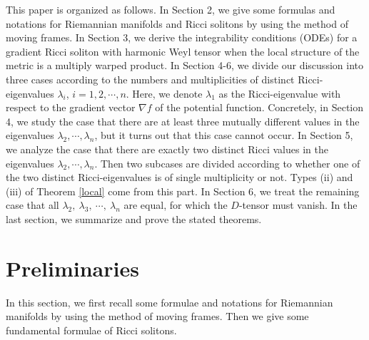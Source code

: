 \documentclass{amsart}
\theoremstyle{definition}
\theoremstyle{remark}
\numberwithin{equation}{section}
\begin{document}
	

This paper is organized as follows. 
In Section 2, we give some formulas and notations for Riemannian manifolds
and Ricci solitons by using the method of moving frames.
In Section 3, we derive the integrability conditions (ODEs) for a gradient Ricci soliton with harmonic Weyl tensor
when the local structure of the metric is a multiply warped product.
In Section 4-6, we divide our discussion into three cases according to the numbers and multiplicities of distinct
Ricci-eigenvalues $\lambda_i$, $i=1,2,\cdots, n$.
Here, we denote $\lambda_1$ as the Ricci-eigenvalue with respect to the gradient vector $\nabla f$ of the potential function. 
Concretely, in Section 4, we study the case that
there are at least three mutually different values in the eigenvalues 
$\lambda_2, \cdots, \lambda_n$,
but it turns out that this case cannot occur.
In Section 5, we analyze the case that 
there are exactly two distinct Ricci values in the eigenvalues $\lambda_2, \cdots, \lambda_n$.
Then two subcases are divided according to 
whether one of the two distinct Ricci-eigenvalues is of single multiplicity or not.
Types {\rm (ii)} and {\rm (iii)} of Theorem \ref{local} come from this part.
In Section 6, we treat the remaining case that all $\lambda_2,~\lambda_3,~\cdots,~\lambda_n$ are equal,
for which the $D$-tensor must vanish. 
In the last section, we summarize and prove the stated theorems.

\section{Preliminaries}
In this section, we first recall some formulae and notations 
for Riemannian manifolds by using the method of moving frames.
Then we give some fundamental formulae of Ricci solitons.
\end{document}
